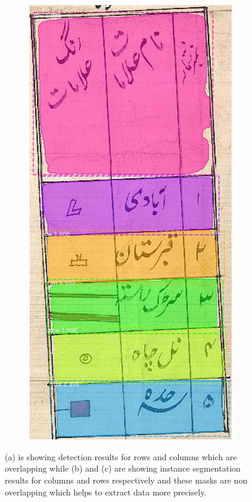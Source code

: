 \begin{figure}[h!]
\begin{subfigure}{0.325\linewidth}
    \caption{}
    \label{}
\end{subfigure}
\begin{subfigure}{0.325\linewidth}
  \centering
  \includegraphics[width=\linewidth]{massavi_1525_rows_mask.jpg}
    \caption{}
    \label{}
\end{subfigure}
\caption{(a) is showing detection results for rows and columns which are overlapping while (b) and (c) are showing instance segmentation results for columns and rows respectively and these masks are non overlapping which helps to extract data more precisely.}
\label{fig:detVsIns}
\end{figure}
